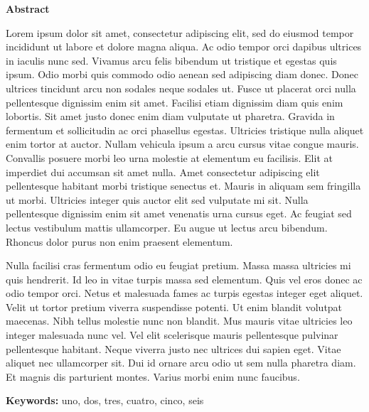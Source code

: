 \thispagestyle{plain}
\begin{center}
	\vspace*{1.5cm}
	{\Large \bfseries  Abstract}
\end{center}
\vspace{0.5cm}
Lorem ipsum dolor sit amet, consectetur adipiscing elit, sed do eiusmod tempor incididunt ut labore et dolore magna aliqua. Ac odio tempor orci dapibus ultrices in iaculis nunc sed. Vivamus arcu felis bibendum ut tristique et egestas quis ipsum. Odio morbi quis commodo odio aenean sed adipiscing diam donec. Donec ultrices tincidunt arcu non sodales neque sodales ut. Fusce ut placerat orci nulla pellentesque dignissim enim sit amet. Facilisi etiam dignissim diam quis enim lobortis. Sit amet justo donec enim diam vulputate ut pharetra. Gravida in fermentum et sollicitudin ac orci phasellus egestas. Ultricies tristique nulla aliquet enim tortor at auctor. Nullam vehicula ipsum a arcu cursus vitae congue mauris. Convallis posuere morbi leo urna molestie at elementum eu facilisis. Elit at imperdiet dui accumsan sit amet nulla. Amet consectetur adipiscing elit pellentesque habitant morbi tristique senectus et. Mauris in aliquam sem fringilla ut morbi. Ultricies integer quis auctor elit sed vulputate mi sit. Nulla pellentesque dignissim enim sit amet venenatis urna cursus eget. Ac feugiat sed lectus vestibulum mattis ullamcorper. Eu augue ut lectus arcu bibendum. Rhoncus dolor purus non enim praesent elementum. 

Nulla facilisi cras fermentum odio eu feugiat pretium. Massa massa ultricies mi quis hendrerit. Id leo in vitae turpis massa sed elementum. Quis vel eros donec ac odio tempor orci. Netus et malesuada fames ac turpis egestas integer eget aliquet. Velit ut tortor pretium viverra suspendisse potenti. Ut enim blandit volutpat maecenas. Nibh tellus molestie nunc non blandit. Mus mauris vitae ultricies leo integer malesuada nunc vel. Vel elit scelerisque mauris pellentesque pulvinar pellentesque habitant. Neque viverra justo nec ultrices dui sapien eget. Vitae aliquet nec ullamcorper sit. Dui id ornare arcu odio ut sem nulla pharetra diam. Et magnis dis parturient montes. Varius morbi enim nunc faucibus.
\newline

\textbf{Keywords: } uno, dos, tres, cuatro, cinco, seis